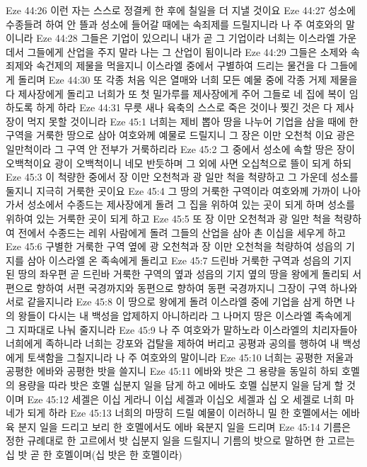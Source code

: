 Eze 44:26  이런 자는 스스로 정결케 한 후에 칠일을 더 지낼 것이요
Eze 44:27  성소에 수종들려 하여 안 뜰과 성소에 들어갈 때에는 속죄제를 드릴지니라 나 주 여호와의 말이니라
Eze 44:28  그들은 기업이 있으리니 내가 곧 그 기업이라 너희는 이스라엘 가운데서 그들에게 산업을 주지 말라 나는 그 산업이 됨이니라
Eze 44:29  그들은 소제와 속죄제와 속건제의 제물을 먹을지니 이스라엘 중에서 구별하여 드리는 물건을 다 그들에게 돌리며
Eze 44:30  또 각종 처음 익은 열매와 너희 모든 예물 중에 각종 거제 제물을 다 제사장에게 돌리고 너희가 또 첫 밀가루를 제사장에게 주어 그들로 네 집에 복이 임하도록 하게 하라
Eze 44:31  무릇 새나 육축의 스스로 죽은 것이나 찢긴 것은 다 제사장이 먹지 못할 것이니라
Eze 45:1  너희는 제비 뽑아 땅을 나누어 기업을 삼을 때에 한 구역을 거룩한 땅으로 삼아 여호와께 예물로 드릴지니 그 장은 이만 오천척 이요 광은 일만척이라 그 구역 안 전부가 거룩하리라
Eze 45:2  그 중에서 성소에 속할 땅은 장이 오백척이요 광이 오백척이니 네모 반듯하며 그 외에 사면 오십척으로 뜰이 되게 하되
Eze 45:3  이 척량한 중에서 장 이만 오천척과 광 일만 척을 척량하고 그 가운데 성소를 둘지니 지극히 거룩한 곳이요
Eze 45:4  그 땅의 거룩한 구역이라 여호와께 가까이 나아가서 성소에서 수종드는 제사장에게 돌려 그 집을 위하여 있는 곳이 되게 하며 성소를 위하여 있는 거룩한 곳이 되게 하고
Eze 45:5  또 장 이만 오천척과 광 일만 척을 척량하여 전에서 수종드는 레위 사람에게 돌려 그들의 산업을 삼아 촌 이십을 세우게 하고
Eze 45:6  구별한 거룩한 구역 옆에 광 오천척과 장 이만 오천척을 척량하여 성읍의 기지를 삼아 이스라엘 온 족속에게 돌리고
Eze 45:7  드린바 거룩한 구역과 성읍의 기지 된 땅의 좌우편 곧 드린바 거룩한 구역의 옆과 성읍의 기지 옆의 땅을 왕에게 돌리되 서편으로 향하여 서편 국경까지와 동편으로 향하여 동편 국경까지니 그장이 구역 하나와 서로 같을지니라
Eze 45:8  이 땅으로 왕에게 돌려 이스라엘 중에 기업을 삼게 하면 나의 왕들이 다시는 내 백성을 압제하지 아니하리라 그 나머지 땅은 이스라엘 족속에게 그 지파대로 나눠 줄지니라
Eze 45:9  나 주 여호와가 말하노라 이스라엘의 치리자들아 너희에게 족하니라 너희는 강포와 겁탈을 제하여 버리고 공평과 공의를 행하여 내 백성에게 토색함을 그칠지니라 나 주 여호와의 말이니라
Eze 45:10  너희는 공평한 저울과 공평한 에바와 공평한 밧을 쓸지니
Eze 45:11  에바와 밧은 그 용량을 동일히 하되 호멜의 용량을 따라 밧은 호멜 십분지 일을 담게 하고 에바도 호멜 십분지 일을 담게 할 것이며
Eze 45:12  세겔은 이십 게라니 이십 세겔과 이십오 세겔과 십 오 세겔로 너희 마네가 되게 하라
Eze 45:13  너희의 마땅히 드릴 예물이 이러하니 밀 한 호멜에서는 에바 육 분지 일을 드리고 보리 한 호멜에서도 에바 육분지 일을 드리며
Eze 45:14  기름은 정한 규례대로 한 고르에서 밧 십분지 일을 드릴지니 기름의 밧으로 말하면 한 고르는 십 밧 곧 한 호멜이며(십 밧은 한 호멜이라)
